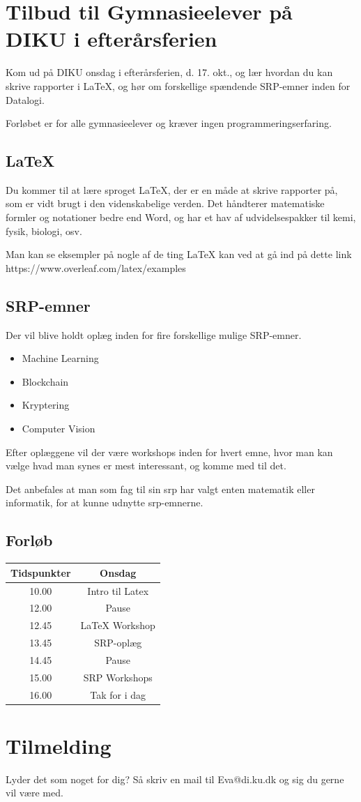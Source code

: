 \documentclass[14pt]{article}
\begin{document}
    \newpage                %
    \setcounter{page}{1}    %
\section*{Tilbud til Gymnasieelever på DIKU i efterårsferien}
Kom ud på DIKU  onsdag i efterårsferien, d. 17. okt., og lær hvordan du kan skrive
rapporter i LaTeX, og hør om forskellige spændende SRP-emner inden for Datalogi.

Forløbet er for alle gymnasieelever og kræver ingen programmeringserfaring.
\subsection*{LaTeX}
    Du kommer til at lære sproget LaTeX, der er en måde at skrive rapporter på,
    som er vidt brugt i den videnskabelige verden. Det håndterer matematiske
    formler og notationer bedre end Word, og har et hav af udvidelsespakker til
    kemi, fysik, biologi, osv.

    Man kan se eksempler på nogle af de ting LaTeX kan ved at gå ind på dette
    link https://www.overleaf.com/latex/examples

\subsection*{SRP-emner}
    Der vil blive holdt oplæg inden for fire forskellige mulige SRP-emner.
    \begin{itemize}
    \item Machine Learning
    \item Blockchain
    \item Kryptering
    \item Computer Vision
    \end{itemize}
    Efter oplæggene vil der være workshops inden for hvert emne, hvor man kan vælge hvad man synes er mest interessant, og komme med til det.

    Det anbefales at man som fag til sin srp har valgt enten matematik eller informatik, for at kunne udnytte srp-emnerne.
\subsection*{Forløb}

\Large{
\begin{center}
\begin{tabular}{ c || c  }
    Tidspunkter &  Onsdag \\
    \hline
    10.00 & Intro til Latex  \\
    12.00 & Pause            \\
    12.45 & LaTeX Workshop   \\
    13.45 & SRP-oplæg        \\
    14.45 & Pause            \\
    15.00 & SRP Workshops    \\
    16.00 & Tak for i dag
\end{tabular}
\end{center}
}

\section*{Tilmelding}
Lyder det som noget for dig? Så skriv en mail til Eva@di.ku.dk og sig du gerne vil være med.
\end{document}
